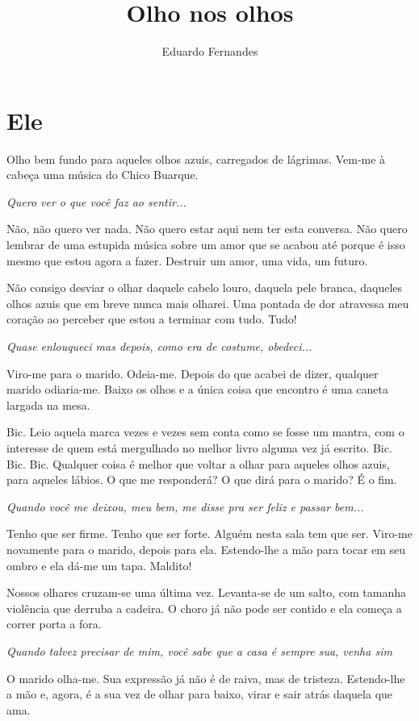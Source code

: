 \documentclass{creativeWriting}
\author{Eduardo Fernandes}
\title{Olho nos olhos}
\begin{document}
\maketitle

\section{Ele}

Olho bem fundo para aqueles olhos azuis, carregados de lágrimas. Vem-me à cabeça uma música do Chico Buarque.

\textit{Quero ver o que você faz ao sentir...}

Não, não quero ver nada. Não quero estar aqui nem ter esta conversa. Não quero lembrar de uma estupida música sobre um amor que se acabou até porque é isso mesmo que estou agora a fazer. Destruir um amor, uma vida, um futuro.

Não consigo desviar o olhar daquele cabelo louro, daquela pele branca, daqueles olhos azuis que em breve nunca mais olharei. Uma pontada de dor atravessa meu coração ao perceber que estou a terminar com tudo. Tudo!

\textit{Quase enlouqueci mas depois, como era de costume, obedeci...}

Viro-me para o marido. Odeia-me. Depois do que acabei de dizer, qualquer marido odiaria-me. Baixo os olhos e a única coisa que encontro é uma caneta largada na mesa.

Bic. Leio aquela marca vezes e vezes sem conta como se fosse um mantra, com o interesse de quem está mergulhado no melhor livro alguma vez já escrito. Bic. Bic. Bic. Qualquer coisa é melhor que voltar a olhar para aqueles olhos azuis, para aqueles lábios. O que me responderá? O que dirá para o marido? É o fim.

\textit{Quando você me deixou, meu bem, me disse pra ser feliz e passar bem...}

Tenho que ser firme. Tenho que ser forte. Alguém nesta sala tem que ser. Viro-me novamente para o marido, depois para ela. Estendo-lhe a mão para tocar em seu ombro e ela dá-me um tapa. Maldito!

Nossos olhares cruzam-se uma última vez. Levanta-se de um salto, com tamanha violência que derruba a cadeira. O choro já não pode ser contido e ela começa a correr porta a fora.

\textit{Quando talvez precisar de mim, você sabe que a casa é sempre sua, venha sim}

 O marido olha-me. Sua expressão já não é de raiva, mas de tristeza. Estendo-lhe a mão e, agora, é a sua vez de olhar para baixo, virar e sair atrás daquela que ama.
 
\end{document}
